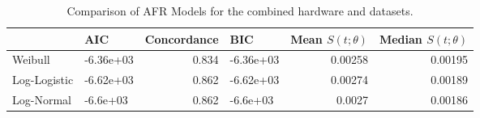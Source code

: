 \begin{table*}
\centering
\caption{Comparison of AFR Models for the combined hardware and datasets.}
\begin{tabular}{llrlrr}
\toprule
 & AIC & Concordance & BIC & Mean $S(t;\theta)$ & Median $S(t;\theta)$ \\
\midrule
Weibull & -6.36e+03 & 0.834 & -6.36e+03 & 0.00258 & 0.00195 \\
Log-Logistic & -6.62e+03 & 0.862 & -6.62e+03 & 0.00274 & 0.00189 \\
Log-Normal & -6.6e+03 & 0.862 & -6.6e+03 & 0.0027 & 0.00186 \\
\bottomrule
\end{tabular}
\label{tab:Combined}
\end{table*}
